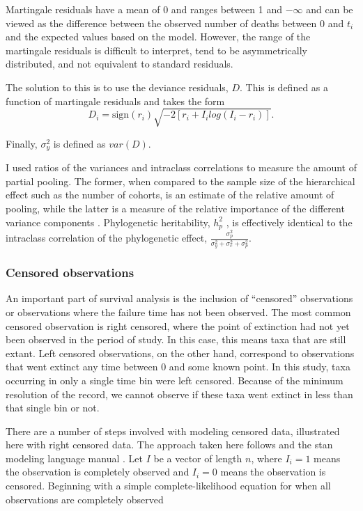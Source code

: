 \documentclass[12pt,letterpaper]{article}
\begin{document}
Martingale residuals have a mean of 0 and ranges between 1 and \(-\infty\) and can be viewed as the difference between the observed number of deaths between 0 and \(t_{i}\) and the expected values based on the model. However, the range of the martingale residuals is difficult to interpret, tend to be asymmetrically distributed, and not equivalent to standard residuals. 

The solution to this is to use the deviance residuals, \(D\). This is defined as a function of martingale residuals and takes the form
\begin{equation}
  D_{i} = \text{sign}(r_{i}) \sqrt{-2[r_{i} + I_{i}log(I_{i} - r_{i})]}.
\end{equation}

Finally, \(\sigma_{y}^{2}\) is defined as \(var(D)\).

I used ratios of the variances and intraclass correlations to measure the amount of partial pooling. The former, when compared to the sample size of the hierarchical effect such as the number of cohorts, is an estimate of the relative amount of pooling, while the latter is a measure of the relative importance of the different variance components \citep{Gelman2007}. Phylogenetic heritability, \(h_{p}^{2}\) \citep{Housworth2004}, is effectively identical to the intraclass correlation of the phylogenetic effect, \(\frac{\sigma_{p}^{2}}{\sigma_{y}^{2} + \sigma_{c}^{2} + \sigma_{p}^{2}}\).



\subsubsection{Censored observations} \label{sec:censor}

An important part of survival analysis is the inclusion of ``censored'' observations \citep{Ibrahim2001,Klein2003} or observations where the failure time has not been observed. The most common censored observation is right censored, where the point of extinction had not yet been observed in the period of study. In this case, this means taxa that are still extant. Left censored observations, on the other hand, correspond to observations that went extinct any time between 0 and some known point. In this study, taxa occurring in only a single time bin were left censored. Because of the minimum resolution of the record, we cannot observe if these taxa went extinct in less than that single bin or not. 

There are a number of steps involved with modeling censored data, illustrated here with right censored data. The approach taken here follows \citet{Gelman2013d} and the stan modeling language manual \citep{stan-manual:2014}. Let \(I\) be a vector of length \(n\), where \(I_{i} = 1\) means the observation is completely observed and \(I_{i} = 0\) means the observation is censored. Beginning with a simple complete-likelihood equation for when all observations are completely observed
\end{document}

